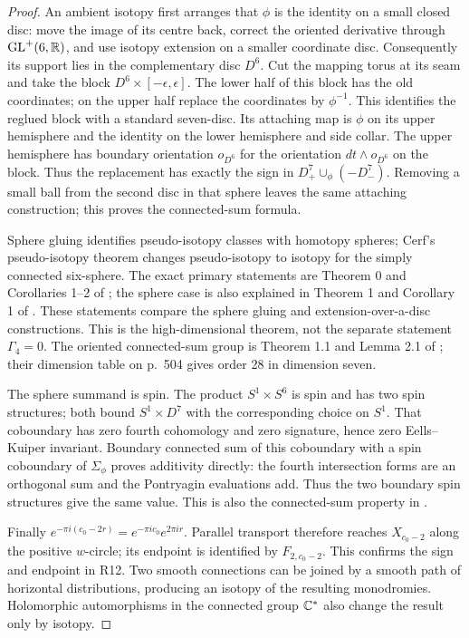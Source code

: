 \begin{proof}
An ambient isotopy first arranges that $\phi$ is the identity on a
small closed disc: move the image of its centre back, correct the
oriented derivative through $\operatorname{GL}^+(6,\mathbb R)$, and use isotopy extension
on a smaller coordinate disc. Consequently its support lies in the
complementary disc $D^6$. Cut the mapping torus at its seam and take
the block $D^6\times[-\epsilon,\epsilon]$. The lower half of this
block has the old coordinates; on the upper half replace the
coordinates by $\phi^{-1}$. This identifies the reglued block with a
standard seven-disc. Its attaching map is $\phi$ on its upper
hemisphere and the identity on the lower hemisphere and side collar.
The upper hemisphere has boundary orientation $o_{D^6}$ for the
orientation $dt\wedge o_{D^6}$ on the block. Thus the replacement
has exactly the sign in $D^7_+\cup_\phi(-D^7_-)$.
Removing a small ball from the second disc in that sphere leaves the
same attaching construction; this proves the connected-sum formula.

Sphere gluing identifies pseudo-isotopy classes with homotopy spheres;
Cerf's pseudo-isotopy theorem changes pseudo-isotopy to isotopy for
the simply connected six-sphere. The exact primary statements are
Theorem 0 and Corollaries 1--2 of \citet[p.~8]{Cerf1970};
the sphere case is also explained in Theorem 1 and Corollary 1 of
\citet[p.~156]{Poenaru1971}. These statements compare the
sphere gluing and extension-over-a-disc constructions. This is the
high-dimensional theorem, not the separate statement $\Gamma_4=0$.
The oriented connected-sum group is Theorem 1.1 and Lemma 2.1 of
\citet[pp.~504--505]{KervaireMilnor1963}; their dimension table on
p.~504 gives order 28 in dimension seven.

The sphere summand is spin. The product $S^1\times S^6$ is spin and
has two spin structures; both bound $S^1\times D^7$ with the
corresponding choice on $S^1$. That coboundary has zero fourth
cohomology and zero signature, hence zero Eells--Kuiper invariant.
Boundary connected sum of this coboundary with a spin coboundary of
$\Sigma_\phi$ proves additivity directly: the fourth intersection
forms are an orthogonal sum and the Pontryagin evaluations add.
Thus the two boundary spin structures give the same value. This is
also the connected-sum property in \citet[Section 3]{EellsKuiper1962}.

Finally $e^{-\pi i(c_0-2r)}=e^{-\pi ic_0}e^{2\pi ir}$.
Parallel transport therefore reaches $X_{c_0-2}$ along the positive
$w$-circle; its endpoint is identified by $F_{2,c_0-2}$.
This confirms the sign and endpoint in R12. Two smooth connections
can be joined by a smooth path of horizontal distributions, producing
an isotopy of the resulting monodromies. Holomorphic automorphisms in
the connected group $\mathbb C^*$ also change the result only by isotopy.
\end{proof}

